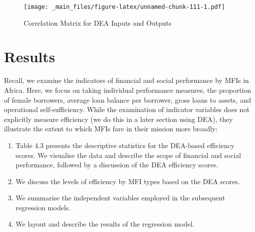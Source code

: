 \documentclass[a4paper, nobind]{templates/ociamthesis}
\providecommand{\tightlist}{%
  \setlength{\itemsep}{0pt}\setlength{\parskip}{0pt}}
\begin{document}
\begin{table}
\begin{tabu}
\\
\\
\\
\\
\\
\end{tabu}
\end{table}

\begin{landscape}

\newpage

\begin{figure}
\centering
\texttt{[image: \_main\_files/figure-latex/unnamed-chunk-111-1.pdf]}
\caption{\label{fig:unnamed-chunk-111}Correlation Matrix for DEA Inputs and Outputs}
\end{figure}

\end{landscape}

\newpage

\hypertarget{results-1}{%
\section{Results}\label{results-1}}

Recall, we examine the indicators of financial and social performance by MFIs in Africa. Here, we focus on taking individual performance measures, the proportion of female borrowers, average loan balance per borrower, gross loans to assets, and operational self-sufficiency. While the examination of indicator variables does not explicitly measure efficiency (we do this in a later section using DEA), they illustrate the extent to which MFIs fare in their mission more broadly:

\begin{enumerate}
\def\labelenumi{\arabic{enumi}.}
\tightlist
\item
  Table 4.3 presents the descriptive statistics for the DEA-based efficiency scores. We visualise the data and describe the scope of financial and social performance, followed by a discussion of the DEA efficiency scores.
\item
  We discuss the levels of efficiency by MFI types based on the DEA scores.
\item
  We summarise the independent variables employed in the subsequent regression models.
\item
  We layout and describe the results of the regression model.
\end{enumerate}
\end{document}
